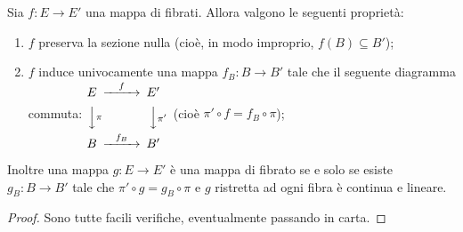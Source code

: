 \begin{proposition} \label{prop:ProprietaMappeFibratiVettoriali}
	Sia $f:E \to E'$ una mappa di fibrati. Allora valgono le seguenti proprietà:
	\begin{enumerate}
	 \item $f$ preserva la sezione nulla (cioè, in modo improprio, $f(B)\subseteq B'$); \label{pmfv:SezioneNulla}
	 \item $f$ induce univocamente una mappa $f_B:B \to B'$ tale che il seguente diagramma commuta:  \label{pmfv:InduceMappaBasi}
	 $\begin{CD}
	 	E	@>f>>	E' \\
	 	@VV\pi V	@VV\pi' V \\
	 	B	@> f_B >> B'
	 \end{CD}\ \ $
	 (cioè $\pi'\circ f = f_B \circ \pi$);
	\end{enumerate}
	Inoltre una mappa $g: E \to E'$ è una mappa di fibrato se e solo se esiste $g_B:B \to B'$ tale che $\pi'\circ g = g_B\circ \pi$ e $g$ ristretta ad ogni fibra è continua e lineare.
\end{proposition}
\begin{proof}
	Sono tutte facili verifiche, eventualmente passando in carta.
\end{proof}